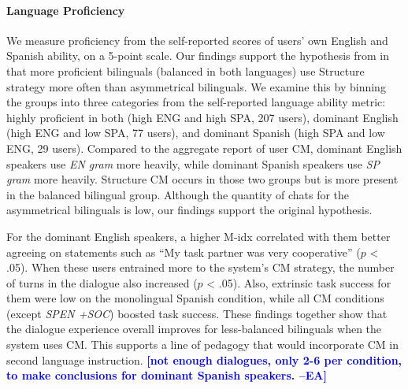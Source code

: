 \documentclass[11pt,a4paper]{article}
\newcommand{\ea}[1]{\textcolor{blue}{\bf\small [#1 --EA]}}
\begin{document}
\paragraph{Language Proficiency}
We measure proficiency from the self-reported scores of users' own English and Spanish ability, on a 5-point scale.
Our findings support the hypothesis from \citet{Deuchar2007} in that more proficient bilinguals (balanced in both languages) use Structure strategy more often than asymmetrical bilinguals. 
We examine this by binning the groups into three categories from the self-reported language ability metric: highly proficient in both (high ENG and high SPA, 207 users), dominant English (high ENG and low SPA, 77 users), and dominant Spanish (high SPA and low ENG, 29 users). 
Compared to the aggregate report of user CM, dominant English speakers use \textit{EN gram} more heavily, while dominant Spanish speakers use \textit{SP gram} more heavily.
Structure CM occurs in those two groups but is more present in the balanced bilingual group.
Although the quantity of chats for the asymmetrical bilinguals is low, our findings support the original hypothesis.

For the dominant English speakers, a higher M-idx correlated with them better agreeing on statements such as ``My task partner was very cooperative'' ($p$ < .05).
When these users entrained more to the system's CM strategy, the number of turns in the dialogue also increased ($p$ < .05). 
Also, extrinsic task success for them were low on the monolingual Spanish condition, while all CM conditions (except \textit{SP\textrightarrow EN +SOC}) boosted task success.
These findings together show that the dialogue experience overall improves for less-balanced bilinguals when the system uses CM.
This supports a line of pedagogy that would incorporate CM in second language instruction.
\ea{not enough dialogues, only 2-6 per condition, to make conclusions for dominant Spanish speakers.}
\end{document}
